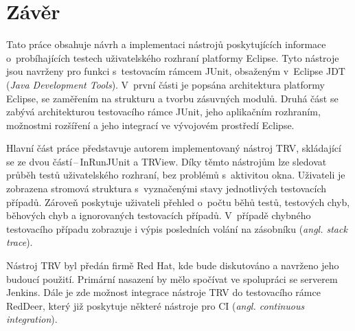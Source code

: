 \chapter{Závěr}                                                           %
Tato práce obsahuje návrh a implementaci nástrojů poskytujících informace o~probíhajících testech uživatelského rozhraní platformy Eclipse. Tyto nástroje  jsou navrženy pro funkci s~testovacím rámcem JUnit, obsaženým v~Eclipse JDT (\emph{Java Development Tools}). V~první části je popsána architektura platformy Eclipse, se zaměřením na strukturu a tvorbu zásuvných modulů. Druhá část se zabývá architekturou testovacího rámce JUnit, jeho aplikačním rozhraním, možnostmi rozšíření a jeho integrací ve vývojovém prostředí Eclipse.

Hlavní část práce představuje autorem implementovaný nástroj TRV, skládající se ze dvou částí\,--\,InRunJUnit a TRView. Díky těmto nástrojům lze sledovat průběh testů uživatelského rozhraní, bez problémů s~aktivitou okna. Uživateli je zobrazena stromová struktura s~vyznačenými stavy jednotlivých testovacích případů. Zároveň poskytuje uživateli přehled o~počtu běhů testů, testových chyb, běhových chyb a ignorovaných testovacích případů. V~případě chybného testovacího případu zobrazuje i výpis posledních volání na zásobníku (\emph{angl. stack trace}).

Nástroj TRV byl předán firmě Red Hat, kde bude diskutováno a navrženo jeho budoucí použití. Primární nasazení by mělo spočívat ve spolupráci se serverem Jenkins. Dále je zde možnost integrace nástroje TRV do testovacího rámce RedDeer, který již poskytuje některé nástroje pro CI (\emph{angl. continuous integration}).